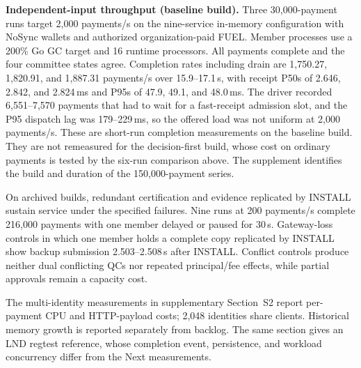 \noindent\textbf{Independent-input throughput (baseline build).}
Three 30,000-payment runs target 2,000 payments/s on the nine-service
in-memory configuration with NoSync wallets and authorized organization-paid
FUEL. Member processes use a 200\% Go GC target and 16 runtime processors. All
payments complete and the four committee states agree. Completion rates
including drain are 1,750.27, 1,820.91, and 1,887.31 payments/s over
15.9--17.1\,s, with receipt P50s of 2.646, 2.842, and 2.824\,ms and P95s of
47.9, 49.1, and 48.0\,ms. The driver recorded 6,551--7,570 payments that had to
wait for a fast-receipt admission slot, and the P95 dispatch lag was
179--229\,ms, so the offered load was not uniform at 2,000 payments/s. These
are short-run completion measurements on the baseline build. They are not
remeasured for the decision-first build, whose cost on ordinary payments is
tested by the six-run comparison above. The supplement identifies the build
and duration of the 150,000-payment series.

On archived builds, redundant certification and evidence replicated by INSTALL
sustain service under the specified failures. Nine runs at 200 payments/s complete
216,000 payments with one member delayed or paused for 30\,s. Gateway-loss
controls in which one member holds a complete copy replicated by INSTALL
show backup submission 2.503--2.508\,s after INSTALL.
Conflict controls produce neither dual conflicting QCs nor repeated
principal/fee effects, while partial approvals remain a capacity cost.

The multi-identity measurements in supplementary Section~S2 report
per-payment CPU and HTTP-payload costs; 2,048 identities share clients.
Historical memory growth is reported separately from backlog. The same
section gives an LND regtest reference, whose completion event,
persistence, and workload concurrency differ from the Next measurements.
